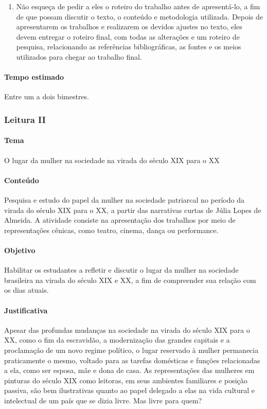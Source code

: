 \documentclass[12pt]{extarticle}
\begin{document}
\begin{enumerate}

\item
Não esqueça de pedir a eles o roteiro do trabalho antes de
apresentá-lo, a fim de que possam discutir o texto, o conteúdo e
metodologia utilizada. Depois de apresentarem os trabalhos e realizarem
os devidos ajustes no texto, eles devem entregar o roteiro final, com
todas as alterações e um roteiro de pesquisa, relacionando as
referências bibliográficas, as fontes e os meios utilizados para chegar
ao trabalho final.
\end{enumerate}

\paragraph{Tempo estimado} Entre um a dois bimestres.



\subsubsection{Leitura II}




\paragraph{Tema} O lugar da mulher na sociedade na virada do século \textsc{XIX} para o \textsc{XX}

\paragraph{Conteúdo} Pesquisa e estudo do papel da mulher na sociedade
patriarcal no período da virada do século \textsc{XIX} para o \textsc{XX}, a partir das
narrativas curtas de Júlia Lopes de Almeida. A atividade consiste na
apresentação dos trabalhos por meio de representações cênicas, como
teatro, cinema, dança ou performance.

\paragraph{Objetivo} Habilitar os estudantes a refletir e discutir o lugar
da mulher na sociedade brasileira na virada do século \textsc{XIX} e \textsc{XX}, a fim de
compreender sua relação com os dias atuais.

\paragraph{Justificativa} Apesar das profundas mudanças na sociedade na
virada do século \textsc{XIX} para o \textsc{XX}, como o fim da escravidão, a modernização
das grandes capitais e a proclamação de um novo regime político, o lugar
reservado à mulher permanecia praticamente o mesmo, voltado para as
tarefas domésticas e funções relacionadas a ela, como ser esposa, mãe e
dona de casa. As representações das mulheres em pinturas do século \textsc{XIX}
como leitoras, em seus ambientes familiares e posição passiva, são bem
ilustrativas quanto ao papel delegado a elas na vida cultural e
intelectual de um país que se dizia livre. Mas livre para quem?
\end{document}
